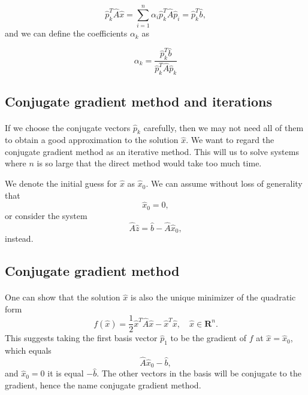 \documentclass[%
oneside,                 %
final,                   %
10pt]{article}
\begin{document}
\begin{equation*}
  \hat{p}_k^T \hat{A}\hat{x} = \sum^{n}_{i=1} \alpha_i\hat{p}_k^T \hat{A}\hat{p}_i= \hat{p}_k^T \hat{b},
\end{equation*}
and we can define the coefficients $\alpha_k$ as

\begin{equation*}
    \alpha_k = \frac{\hat{p}_k^T \hat{b}}{\hat{p}_k^T \hat{A} \hat{p}_k}
\end{equation*}



\subsection{Conjugate gradient method and iterations}

\paragraph{}

If we choose the conjugate vectors $\hat{p}_k$ carefully, 
then we may not need all of them to obtain a good approximation to the solution 
$\hat{x}$. 
We want to regard the conjugate gradient method as an iterative method. 
This will us to solve systems where $n$ is so large that the direct 
method would take too much time.

We denote the initial guess for $\hat{x}$ as $\hat{x}_0$. 
We can assume without loss of generality that
\begin{equation*}
\hat{x}_0=0,
\end{equation*}
or consider the system
\begin{equation*}
\hat{A}\hat{z} = \hat{b}-\hat{A}\hat{x}_0,
\end{equation*}
instead.




\subsection{Conjugate gradient method}

\paragraph{}
One can show that the solution $\hat{x}$ is also the unique minimizer of the quadratic form
\begin{equation*}
  f(\hat{x}) = \frac{1}{2}\hat{x}^T\hat{A}\hat{x} - \hat{x}^T \hat{x} , \quad \hat{x}\in\mathbf{R}^n. 
\end{equation*}
This suggests taking the first basis vector $\hat{p}_1$ 
to be the gradient of $f$ at $\hat{x}=\hat{x}_0$, 
which equals
\begin{equation*}
\hat{A}\hat{x}_0-\hat{b},
\end{equation*}
and 
$\hat{x}_0=0$ it is equal $-\hat{b}$.
The other vectors in the basis will be conjugate to the gradient, 
hence the name conjugate gradient method.
\end{document}
